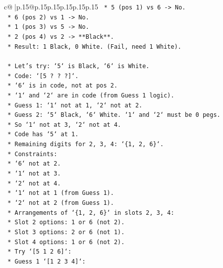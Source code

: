 \documentclass{article}
\begin{document}
{\begin{supertabular}{c@{$\;$}|p{.15\linewidth}@{}p{.15\linewidth}p{.15\linewidth}p{.15\linewidth}p{.15\linewidth}p{.15\linewidth}}
{{{\texttt{                            *   5 (pos 1) vs 6 {-}> No.} \\
\texttt{                            *   6 (pos 2) vs 1 {-}> No.} \\
\texttt{                            *   1 (pos 3) vs 5 {-}> No.} \\
\texttt{                            *   2 (pos 4) vs 2 {-}> **Black**.} \\
\texttt{                            *   Result: 1 Black, 0 White. (Fail, need 1 White).} \\
\\ 
\texttt{    *   Let's try: `5` is Black, `6` is White.} \\
\texttt{        *   Code: `{[}5 ? ? ?{]}`.} \\
\texttt{        *   `6` is in code, not at pos 2.} \\
\texttt{        *   `1` and `2` are in code (from Guess 1 logic).} \\
\texttt{        *   Guess 1: `1` not at 1, `2` not at 2.} \\
\texttt{        *   Guess 2: `5` Black, `6` White. `1` and `2` must be 0 pegs.} \\
\texttt{        *   So `1` not at 3, `2` not at 4.} \\
\texttt{        *   Code has `5` at 1.} \\
\texttt{        *   Remaining digits for 2, 3, 4: `\{1, 2, 6\}`.} \\
\texttt{        *   Constraints:} \\
\texttt{            *   `6` not at 2.} \\
\texttt{            *   `1` not at 3.} \\
\texttt{            *   `2` not at 4.} \\
\texttt{            *   `1` not at 1 (from Guess 1).} \\
\texttt{            *   `2` not at 2 (from Guess 1).} \\
\texttt{        *   Arrangements of `\{1, 2, 6\}` in slots 2, 3, 4:} \\
\texttt{            *   Slot 2 options: 1 or 6 (not 2).} \\
\texttt{            *   Slot 3 options: 2 or 6 (not 1).} \\
\texttt{            *   Slot 4 options: 1 or 6 (not 2).} \\
\texttt{            *   Try `{[}5 1 2 6{]}`:} \\
\texttt{                *   Guess 1 `{[}1 2 3 4{]}`:} \\
}}}
\end{supertabular}}
\end{document}
